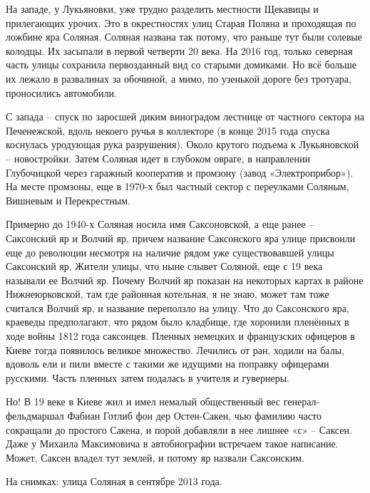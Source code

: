 На западе, у Лукьяновки, уже трудно разделить местности Щекавицы и прилегающих урочих. Это в окрестностях улиц Старая Поляна и проходящая по ложбине яра Соляная. Соляная названа так потому, что раньше тут были солевые колодцы. Их засыпали в первой четверти 20 века. На 2016 год, только северная часть улицы сохранила первозданный вид со старыми домиками. Но всё больше их лежало в развалинах за обочиной, а мимо, по узенькой дороге без тротуара, проносились автомобили.

С запада – спуск по заросшей диким виноградом лестнице от частного сектора на Печенежской, вдоль некоего ручья в коллекторе (в конце 2015 года спуска коснулась уродующая рука разрушения). Около крутого подъема к Лукьяновской – новостройки. Затем Соляная идет в глубоком овраге, в направлении Глубочицкой через гаражный кооператив и промзону (завод «Электроприбор»). На месте промзоны, еще в 1970-х был частный сектор с переулками Соляным, Вишневым и Перекрестным.

Примерно до 1940-х Соляная носила имя Саксоновской, а еще ранее – Саксонский яр и Волчий яр, причем название Саксонского яра улице присвоили еще до революции несмотря на наличие рядом уже существовавшей улицы Саксонский яр. Жители улицы, что ныне слывет Соляной, еще с 19 века называли ее Волчий яр. Почему Волчий яр показан на некоторых картах в районе Нижнеюрковской, там где районная котельная, я не знаю, может там тоже считался Волчий яр, и название переползло на улицу. Что до Саксонского яра, краеведы предполагают, что рядом было кладбище, где хоронили пленённых в ходе войны 1812 года саксонцев. Пленных немецких и французских офицеров в Киеве тогда появилось великое множество. Лечились от ран, ходили на балы, вдоволь ели и пили вместе с такими же идущими на поправку офицерами русскими. Часть пленных затем подалась в учителя и гувернеры.


Но! В 19 веке в Киеве жил и имел немалый общественный вес генерал-фельдмаршал Фабиан Готлиб фон дер Остен-Сакен, чью фамилию часто сокращали до простого Сакена, и порой добавляли в нее лишнее «с» – Саксен. Даже у Михаила Максимовича в автобиографии встречаем такое написание. Может, Саксен владел тут землей, и потому яр назвали Саксонским.

На снимках: улица Соляная в сентябре 2013 года.

